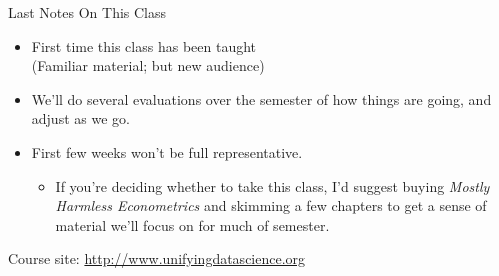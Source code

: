 \documentclass[11pt]{beamer}
\begin{document}
\begin{frame}[c]{Last Notes On This Class}
\begin{itemize}
  \pause \item First time this class has been taught \\
  (Familiar material; but new audience)
  \pause \item We'll do several evaluations over the semester of how things are going, and adjust as we go.
  \pause \item First few weeks won't be full representative.
  \begin{itemize}
    \pause \item If you're deciding whether to take this class, I'd suggest buying \emph{Mostly Harmless Econometrics} and skimming a few chapters to get a sense of material we'll focus on for much of semester.
  \end{itemize}
\end{itemize}
\end{frame}

\begin{frame}[c]{}
Course site: \url{http://www.unifyingdatascience.org}

\end{frame}
\end{document}
